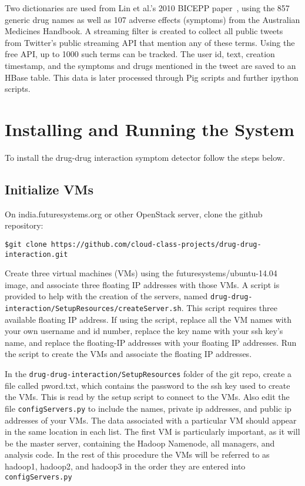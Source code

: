 \documentclass[letterpaper]{article}
\begin{document}
Two dictionaries are used from Lin et al.'s 2010 BICEPP paper~\citep{lin2011bicepp}, using the 857 generic drug names as well as 107 adverse effects (symptoms) from the Australian Medicines Handbook. A streaming filter is created to collect all public tweets from Twitter's public streaming API that mention any of these terms. Using the free API, up to 1000 such terms can be tracked. The user id, text, creation timestamp, and the symptoms and drugs mentioned in the tweet are saved to an HBase table. This data is later processed through Pig scripts and further ipython scripts. 

\section{Installing and Running the System}

To install the drug-drug interaction symptom detector follow the steps below.

\subsection{Initialize VMs} 
On india.futuresystems.org or other OpenStack server, clone the github repository: \
\begin{lstlisting}
$git clone https://github.com/cloud-class-projects/drug-drug-interaction.git
\end{lstlisting}

Create three virtual machines (VMs) using the futuresystems/ubuntu-14.04 image, and associate three floating IP addresses with those VMs. A script is provided to help with the creation of the servers, named \lstinline|drug-drug-interaction/SetupResources/createServer.sh|. This script requires three available floating IP address. If using the script, replace all the VM names with your own username and id number, replace the key name with your ssh key's name, and replace the floating-IP addresses with your floating IP addresses. Run the script to create the VMs and associate the floating IP addresses.

In the \lstinline|drug-drug-interaction/SetupResources| folder of the git repo, create a file called pword.txt, which contains the password to the ssh key used to create the VMs. This is read by the setup script to connect to the VMs. Also edit the file \lstinline|configServers.py| to include the names, private ip addresses, and public ip addresses of your VMs. The data associated with a particular VM should appear in the same location in each list. The first VM is particularly important, as it will be the master server, containing the Hadoop Namenode, all managers, and analysis code. In the rest of this procedure the VMs will be referred to as hadoop1, hadoop2, and hadoop3 in the order they are entered into \lstinline|configServers.py|
\end{document}
